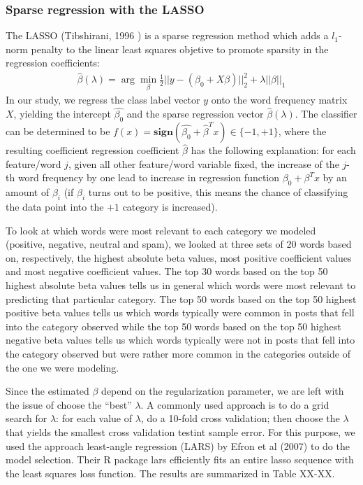 \documentclass[11pt]{article}
\newcommand{\1}[1]{{\mathbf 1}\left\{#1\right\}}        %
\begin{document}
\subsubsection{Sparse regression with the LASSO}
The LASSO (Tibshirani, 1996 \cite{Tibs}) is a sparse regression method which adds a $l_1$-norm penalty to the linear least squares objetive to promote sparsity in the regression coefficients:
\begin{align}
\label{eq:Lasso}
\hat{\beta}(\lambda) = \arg \min_\beta \frac{1}{2}||y-(\beta_0+X\beta)||_2^2 + \lambda ||\beta||_1
\end{align}
In our study, we regress the class label vector $y$ onto the word frequency matrix $X$, yielding the intercept $\hat{\beta_0}$ and the sparse regression vector $\hat{\beta}(\lambda)$. The classifier can be determined to be $f(x) = \textbf{sign}(\hat{\beta_0}+\hat{\beta}^Tx)\in\{-1,+1\}$, where the resulting coefficient regression coefficient $\hat{\beta}$ has the following explanation: for each feature/word $j$, given all other feature/word variable fixed, the increase of the $j$-th word frequency by one lead to increase in regression function $\beta_0+\beta^Tx$ by an amount of $\beta_i$ (if $\beta_i$ turns out to be positive, this means the chance of classifying the data point into the $+1$ category is increased).

To look at which words were most relevant to each category we modeled (positive, negative, neutral and spam), we looked at three sets of 20 words based on, respectively, the highest absolute beta values, most positive coefficient values and most negative coefficient values. The top 30 words based on the top 50 highest absolute beta values tells us in general which words were most relevant to predicting that particular category.  The top 50 words based on the top 50 highest positive beta values tells us which words typically were common in posts that fell into the category observed while the top 50 words based on the top 50 highest negative beta values tells us which words typically were not in posts that fell into the category observed but were rather more common in the categories outside of the one we were modeling.

Since the estimated $\beta$ depend on the regularization parameter, we are left with the issue of choose the ``best'' $\lambda$. A commonly used approach is to do a grid search for $\lambda$: for each value of $\lambda$, do a 10-fold cross validation; then choose the $\lambda$ that yields the smallest cross validation testint sample error. For this purpose, we used the approach least-angle regression (LARS) by Efron et al (2007) to do the model selection. Their R package lars efficiently fits an entire lasso sequence with the least squares loss function. The results are summarized in Table XX-XX.
\end{document}
